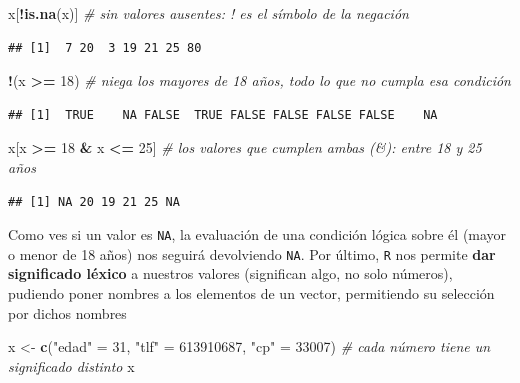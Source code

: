 \documentclass[11pt,]{book}
\newenvironment{Shaded}{\begin{snugshade}}{\end{snugshade}}
\newcommand{\CommentTok}[1]{\textcolor[rgb]{0.37,0.37,0.37}{\textit{#1}}}
\newcommand{\DecValTok}[1]{\textcolor[rgb]{0.06,0.06,0.06}{#1}}
\newcommand{\KeywordTok}[1]{\textcolor[rgb]{0.27,0.27,0.27}{\textbf{#1}}}
\newcommand{\NormalTok}[1]{#1}
\newcommand{\OperatorTok}[1]{\textcolor[rgb]{0.43,0.43,0.43}{\textbf{#1}}}
\newcommand{\StringTok}[1]{\textcolor[rgb]{0.5,0.5,0.5}{#1}}
\begin{document}
\begin{Shaded}
\begin{Highlighting}[]
\NormalTok{x[}\OperatorTok{!}\KeywordTok{is.na}\NormalTok{(x)] }\CommentTok{# sin valores ausentes: ! es el símbolo de la negación}
\end{Highlighting}
\end{Shaded}

\begin{verbatim}
## [1]  7 20  3 19 21 25 80
\end{verbatim}

\begin{Shaded}
\begin{Highlighting}[]
\OperatorTok{!}\NormalTok{(x }\OperatorTok{>=}\StringTok{ }\DecValTok{18}\NormalTok{) }\CommentTok{# niega los mayores de 18 años, todo lo que no cumpla esa condición}
\end{Highlighting}
\end{Shaded}

\begin{verbatim}
## [1]  TRUE    NA FALSE  TRUE FALSE FALSE FALSE FALSE    NA
\end{verbatim}

\begin{Shaded}
\begin{Highlighting}[]
\NormalTok{x[x }\OperatorTok{>=}\StringTok{ }\DecValTok{18} \OperatorTok{&}\StringTok{ }\NormalTok{x }\OperatorTok{<=}\StringTok{ }\DecValTok{25}\NormalTok{] }\CommentTok{# los valores que cumplen ambas (&): entre 18 y 25 años}
\end{Highlighting}
\end{Shaded}

\begin{verbatim}
## [1] NA 20 19 21 25 NA
\end{verbatim}

Como ves si un valor es \texttt{NA}, la evaluación de una condición lógica sobre él (mayor o menor de 18 años) nos seguirá devolviendo \texttt{NA}. Por último, \texttt{R} nos permite \textbf{dar significado léxico} a nuestros valores (significan algo, no solo números), pudiendo poner nombres a los elementos de un vector, permitiendo su selección por dichos nombres

\begin{Shaded}
\begin{Highlighting}[]
\NormalTok{x <-}\StringTok{ }\KeywordTok{c}\NormalTok{(}\StringTok{"edad"}\NormalTok{ =}\StringTok{ }\DecValTok{31}\NormalTok{, }\StringTok{"tlf"}\NormalTok{ =}\StringTok{ }\DecValTok{613910687}\NormalTok{, }\StringTok{"cp"}\NormalTok{ =}\StringTok{ }\DecValTok{33007}\NormalTok{) }\CommentTok{# cada número tiene un significado distinto}
\NormalTok{x}
\end{Highlighting}
\end{Shaded}
\end{document}
